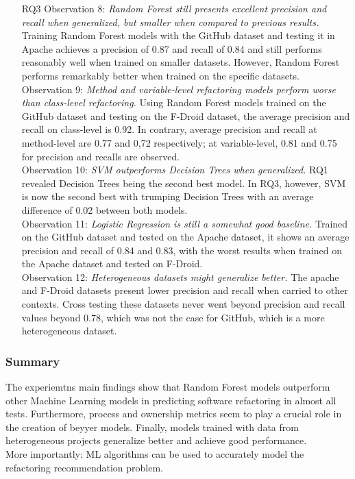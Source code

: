 \begin{itemize}
    \item[RQ3] Observation 8: \textit{Random Forest still presents excellent precision and recall when generalized, but smaller when compared to previous results.} Training Random Forest models with the GitHub dataset and testing it in Apache achieves a precision of 0.87 and recall of 0.84 and still performs reasonably well when trained on smaller datasets. However, Random Forest performs remarkably better when trained on the specific datasets.\\Observation 9: \textit{Method and variable-level refactoring models perform worse than class-level refactoring.} Using Random Forest models trained on the GitHub dataset and testing on the F-Droid dataset, the average precision and recall on class-level is 0.92. In contrary, average precision and recall at method-level are 0.77 and 0,72 respectively; at variable-level, 0.81 and 0.75 for precision and recalls are observed.\\ Observation 10: \textit{SVM outperforms Decision Trees when generalized.} RQ1 revealed Decision Trees being the second best model. In RQ3, however, SVM is now the second best with trumping Decision Trees with an average difference of 0.02 between both models.\\ Observation 11: \textit{Logistic Regression is still a somewhat good baseline.} Trained on the GitHub dataset and tested on the Apache dataset, it shows an average precision and recall of 0.84 and 0.83, with the worst results when trained on the Apache dataset and tested on F-Droid. \\ Observation 12: \textit{Heterogeneous datasets might generalize better.} The apache and F-Droid datasets present lower precision and recall when carried to other contexts. Cross testing these datasets never went beyond precision and recall values beyond 0.78, which was not the case for GitHub, which is a more heterogeneous dataset.
\end{itemize}
\subsubsection{Summary}
The experiemtns main findings show that Random Forest models outperform other Machine Learning models in predicting software refactoring in almost all tests. Furthermore, process and ownership metrics seem to play a crucial role in the creation of beyyer models. Finally, models trained with data from heterogeneous projects generalize better and achieve good performance.\\
More importantly: ML algorithms can be used to accurately model the refactoring recommendation problem.